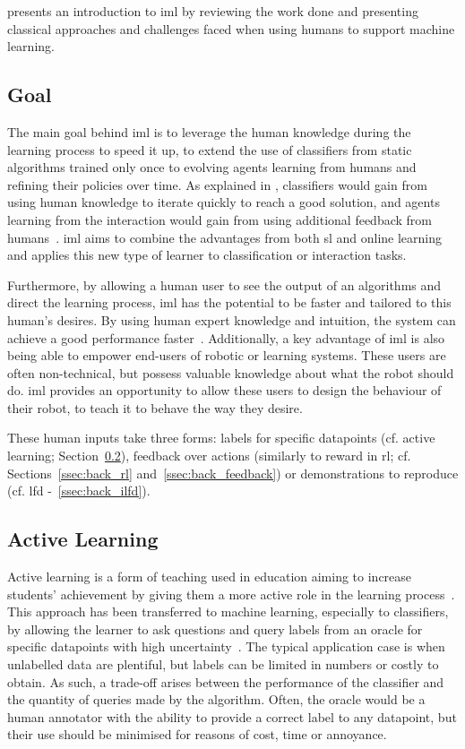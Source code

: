 \cite{amershi2014power} presents an introduction to \gls{iml} by reviewing the work done and presenting classical approaches and challenges faced when using humans to support machine learning.

\subsection{Goal}

The main goal behind \gls{iml} is to leverage the human knowledge during the learning process to speed it up, to extend the use of classifiers from static algorithms trained only once to evolving agents learning from humans and refining their policies over time. As explained in \cite{fails2003interactive}, classifiers would gain from using human knowledge to iterate quickly to reach a good solution, and agents learning from the interaction would gain from using additional feedback from humans~\citep{thomaz2008teachable,knox2009interactively}. \gls{iml} aims to combine the advantages from both \gls{sl} and online learning and applies this new type of learner to classification or interaction tasks.

Furthermore, by allowing a human user to see the output of an algorithms and direct the learning process, \gls{iml} has the potential to be faster and tailored to this human's desires. By using human expert knowledge and intuition, the system can achieve a good performance faster~\citep{thomaz2008teachable}. Additionally, a key advantage of \gls{iml} is also being able to empower end-users of robotic or learning systems. These users are often non-technical, but possess valuable knowledge about what the robot should do. \gls{iml} provides an opportunity to allow these users to design the behaviour of their robot, to teach it to behave the way they desire.

These human inputs take three forms: labels for specific datapoints (cf. active learning; Section~\ref{ssec:back_active}), feedback over actions (similarly to reward in \gls{rl}; cf. Sections~\ref{ssec:back_rl} and~\ref{ssec:back_feedback}) or demonstrations to reproduce (cf. \gls{lfd} -~\ref{ssec:back_ilfd}).

\subsection{Active Learning} \label{ssec:back_active}

Active learning is a form of teaching used in education aiming to increase students' achievement by giving them a more active role in the learning process~\citep{johnson1991active}. This approach has been transferred to machine learning, especially to classifiers, by allowing the learner to ask questions and query labels from an oracle for specific datapoints with high uncertainty~\citep{settles2012active}. The typical application case is when unlabelled data are plentiful, but labels can be limited in numbers or costly to obtain. As such, a trade-off arises between the performance of the classifier and the quantity of queries made by the algorithm. Often, the oracle would be a human annotator with the ability to provide a correct label to any datapoint, but their use should be minimised for reasons of cost, time or annoyance.

